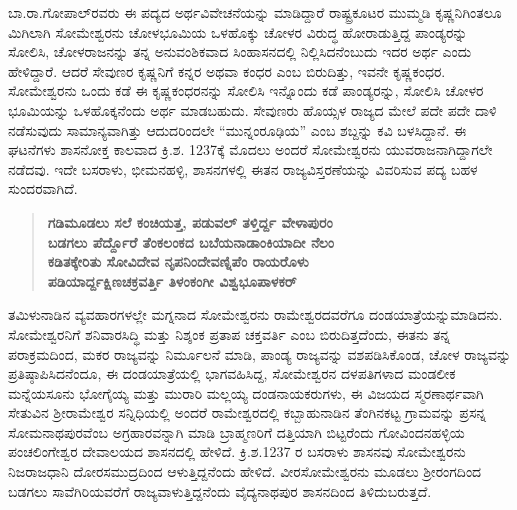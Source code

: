ಬಾ.ರಾ.ಗೋಪಾಲ್​ರವರು ಈ ಪದ್ಯದ ಅರ್ಥವಿವೇಚನೆಯನ್ನು ಮಾಡಿದ್ದಾರೆ ರಾಷ್ಟ್ರಕೂಟರ ಮುಮ್ಮಡಿ ಕೃಷ್ಣನಿಗಿಂತಲೂ ಮಿಗಿಲಾಗಿ ಸೋಮೇಶ್ವರನು ಚೋಳಭೂಮಿಯ ಒಳಹೊಕ್ಕು ಚೋಳರ ವಿರುದ್ಧ ಹೋರಾಡುತ್ತಿದ್ದ ಪಾಂಡ್ಯರನ್ನು ಸೋಲಿಸಿ, ಚೋಳರಾಜನನ್ನು ತನ್ನ ಅನುವಂಶಿಕವಾದ ಸಿಂಹಾಸನದಲ್ಲಿ ನಿಲ್ಲಿಸಿದನೆಂಬುದು ಇದರ ಅರ್ಥ ಎಂದು ಹೇಳಿದ್ದಾರೆ. ಆದರೆ ಸೇವುಣರ ಕೃಷ್ಣನಿಗೆ ಕನ್ನರ ಅಥವಾ ಕಂಧರ ಎಂಬ ಬಿರುದಿತ್ತು, ಇವನೇ ಕೃಷ್ಣಕಂಧರ. ಸೋಮೇಶ್ವರನು ಒಂದು ಕಡೆ ಈ ಕೃಷ್ಣಕಂಧರನನ್ನು ಸೋಲಿಸಿ ಇನ್ನೊಂದು ಕಡೆ ಪಾಂಡ್ಯರನ್ನು, ಸೋಲಿಸಿ ಚೋಳರ ಭೂಮಿಯನ್ನು ಒಳಹೊಕ್ಕನೆಂದು ಅರ್ಥ ಮಾಡಬಹುದು. ಸೇವುಣರು ಹೊಯ್ಸಳ ರಾಜ್ಯದ ಮೇಲೆ ಪದೇ ಪದೇ ದಾಳಿ ನಡೆಸುವುದು ಸಾಮಾನ್ಯವಾಗಿತ್ತು ಆದುದರಿಂದಲೇ “ಮುನ್ನಂರೂಢಿಯ” ಎಂಬ ಶಬ್ದನ್ನು ಕವಿ ಬಳಸಿದ್ದಾನೆ. ಈ ಘಟನೆಗಳು ಶಾಸನೋಕ್ತ ಕಾಲವಾದ ಕ್ರಿ.ಶ. 1237ಕ್ಕೆ ಮೊದಲು ಅಂದರೆ ಸೋಮೇಶ್ವರನು ಯುವರಾಜನಾಗಿದ್ದಾಗಲೇ ನಡೆದವು. ಇದೇ ಬಸರಾಳು, ಭೀಮನಹಳ್ಳಿ, ಶಾಸನಗಳಲ್ಲಿ ಈತನ ರಾಜ್ಯವಿಸ್ತರಣೆಯನ್ನು ವಿವರಿಸುವ ಪದ್ಯ ಬಹಳ ಸುಂದರವಾಗಿದೆ.

\begin{verse}
\textbf{ಗಡಿಮೂಡಲು ಸಲೆ ಕಂಚಿಯತ್ತ, ಪಡುವಲ್​ ತಳ್ತಿರ್ದ್ದ ವೇಳಾಪುರಂ} \\\textbf{ಬಡಗಲು ಪೆರ್ದ್ದೊರೆ ತೆಂಕಲಂಕದ ಬಬೆಯನಾಡಾಂಕಿಯಾದೀ ನೆಲಂ} \\\textbf{ಕಡಿತಕ್ಕೇರಿತು ಸೋವಿದೇವ ನೃಪನಿಂದೇವಣ್ನಿಪೆಂ ರಾಯರೊಳು} \\\textbf{ಪಡಿಯಾರ್ದ್ದಕ್ಷಿಣಚಕ್ರವರ್ತ್ತಿ ತಿಳಂಕಂಗೀ ವಿಶ್ವಭೂಪಾಳಕರ್​}
\end{verse}

ತಮಿಳುನಾಡಿನ ವ್ಯವಹಾರಗಳಲ್ಲೇ ಮಗ್ನನಾದ ಸೋಮೇಶ್ವರನು ರಾಮೇಶ್ವರದವರೆಗೂ ದಂಡಯಾತ್ರೆಯನ್ನು\break ಮಾಡಿದನು. ಸೋಮೇಶ್ವರನಿಗೆ ಶನಿವಾರಸಿದ್ಧಿ ಮತ್ತು ನಿಶ್ಶಂಕ ಪ್ರತಾಪ ಚಕ್ತವರ್ತಿ ಎಂಬ ಬಿರುದಿತ್ತದೆಂದು, ಈತನು ತನ್ನ ಪರಾಕ್ರಮದಿಂದ, ಮಕರ ರಾಜ್ಯವನ್ನು ನಿರ್ಮೂಲನೆ ಮಾಡಿ, ಪಾಂಡ್ಯ ರಾಜ್ಯವನ್ನು ವಶಪಡಿಸಿಕೊಂಡ, ಚೋಳ ರಾಜ್ಯವನ್ನು ಪ್ರತಿಷ್ಠಾಪಿಸಿದನೆಂದೂ, ಈ ದಂಡಯಾತ್ರೆಯಲ್ಲಿ ಭಾಗವಹಿಸಿದ್ದ, ಸೋಮೇಶ್ವರನ ದಳಪತಿಗಳಾದ ಮಂಡಲೀಕ ಮನ್ನೆಯಸೂನು ಭೋಗೈಯ್ಯ ಮತ್ತು ಮುರಾರಿ ಮಲ್ಲಯ್ಯ ದಂಡನಾಯಕರುಗಳು, ಈ ವಿಜಯದ ಸ್ಮರಣಾರ್ಥವಾಗಿ ಸೇತುವಿನ ಶ‍್ರೀರಾಮೇಶ್ವರ ಸನ್ನಿಧಿಯಲ್ಲಿ ಅಂದರೆ ರಾಮೇಶ್ವರದಲ್ಲಿ ಕಬ್ಬಾಹುನಾಡಿನ ತೆಂಗಿನಕಟ್ಟ ಗ್ರಾಮವನ್ನು ಪ್ರಸನ್ನ ಸೋಮನಾಥಪುರವೆಂಬ ಅಗ್ರಹಾರವನ್ನಾಗಿ ಮಾಡಿ ಬ್ರಾಹ್ಮಣರಿಗೆ ದತ್ತಿಯಾಗಿ ಬಿಟ್ಟರೆಂದು ಗೋವಿಂದನಹಳ್ಳಿಯ ಪಂಚಲಿಂಗೇಶ್ವರ ದೇವಾಲಯದ ಶಾಸನದಲ್ಲಿ ಹೇಳಿದೆ. ಕ್ರಿ.ಶ.1237 ರ ಬಸರಾಳು ಶಾಸನವು ಸೋಮೇಶ್ವರನು ನಿಜರಾಜಧಾನಿ ದೋರಸಮುದ್ರ\-ದಿಂದ ಆಳುತ್ತಿದ್ದನೆಂದು ಹೇಳಿದೆ. ವೀರಸೋಮೇಶ್ವರನು ಮೂಡಲು ಶ‍್ರೀರಂಗದಿಂದ ಬಡಗಲು ಸಾವೆಗಿರಿಯವರೆಗೆ ರಾಜ್ಯವಾಳುತ್ತಿದ್ದನೆಂದು ವೈದ್ಯನಾಥಪುರ ಶಾಸನದಿಂದ ತಿಳಿದುಬರುತ್ತದೆ. 

